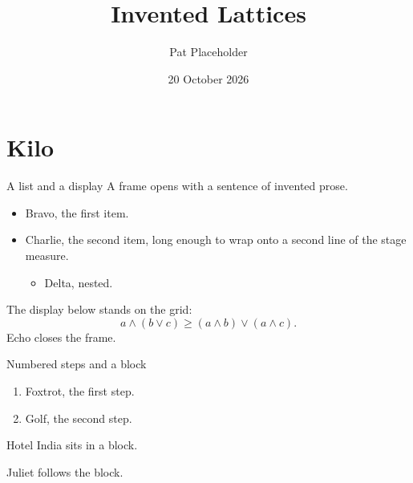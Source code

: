 \documentclass{ltframe}
\title{Invented Lattices}
\author{Pat Placeholder}
\date{20 October 2026}
\begin{document}
\begin{frame}
\titlepage
\end{frame}
\section{Kilo}
\begin{frame}{A list and a display}
A frame opens with a sentence of invented prose.
\begin{itemize}
\item Bravo, the first item.
\item Charlie, the second item, long enough to wrap onto a second line of the stage measure.
  \begin{itemize}\item Delta, nested.\end{itemize}
\end{itemize}
The display below stands on the grid:
\[ a \wedge (b \vee c) \ge (a \wedge b) \vee (a \wedge c). \]
Echo closes the frame.
\end{frame}
\begin{frame}{Numbered steps and a block}
\begin{enumerate}
\item Foxtrot, the first step.
\item Golf, the second step.
\end{enumerate}
\begin{block}{Hotel}
India sits in a block.
\end{block}
Juliet follows the block.
\end{frame}
\end{document}
